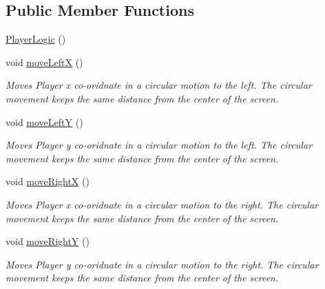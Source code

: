 \subsection*{Public Member Functions}
\begin{DoxyCompactItemize}
\item 
\hyperlink{class_player_logic_aa14c9bac512df3d01ea4db0224e82405}{Player\+Logic} ()
\item 
\mbox{\label{class_player_logic_ac4d252e80757e05b5799ab689ee27d5e}} 
void \hyperlink{class_player_logic_ac4d252e80757e05b5799ab689ee27d5e}{move\+LeftX} ()
\begin{DoxyCompactList}\small\item\em Moves Player x co-\/oridnate in a circular motion to the left. The circular movement keeps the same distance from the center of the screen. \end{DoxyCompactList}\item 
\mbox{\label{class_player_logic_a006a7633ae5839d307bb90099f9d2745}} 
void \hyperlink{class_player_logic_a006a7633ae5839d307bb90099f9d2745}{move\+LeftY} ()
\begin{DoxyCompactList}\small\item\em Moves Player y co-\/oridnate in a circular motion to the left. The circular movement keeps the same distance from the center of the screen. \end{DoxyCompactList}\item 
\mbox{\label{class_player_logic_a9c96291506bb5347f2c503bba4100fd4}} 
void \hyperlink{class_player_logic_a9c96291506bb5347f2c503bba4100fd4}{move\+RightX} ()
\begin{DoxyCompactList}\small\item\em Moves Player x co-\/oridnate in a circular motion to the right. The circular movement keeps the same distance from the center of the screen. \end{DoxyCompactList}\item 
\mbox{\label{class_player_logic_a4b77bba06ba630f974aaa85306109485}} 
void \hyperlink{class_player_logic_a4b77bba06ba630f974aaa85306109485}{move\+RightY} ()
\begin{DoxyCompactList}\small\item\em Moves Player y co-\/oridnate in a circular motion to the right. The circular movement keeps the same distance from the center of the screen. \end{DoxyCompactList}\item 

\end{DoxyCompactItemize}
